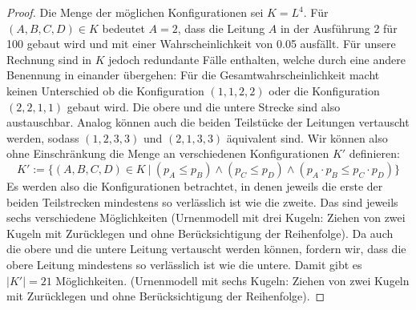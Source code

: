 \documentclass[a4paper]{scrartcl}
\begin{document}
\begin{enumerate}[label=\bfseries\arabic*.]
\begin{proof}
                    Die Menge der möglichen Konfigurationen sei $K = L^4$.
                    Für $(A, B, C, D) \in K$ bedeutet $A = 2$, dass die 
                    Leitung $A$ in der Ausführung 2 für 100 \EUR gebaut wird und
                    mit einer Wahrscheinlichkeit von \num{0,05} ausfällt.
                    Für unsere Rechnung sind in $K$ jedoch redundante Fälle
                    enthalten, welche durch eine andere Benennung in einander
                    übergehen:
                    Für die Gesamtwahrscheinlichkeit macht keinen Unterschied ob
                    die Konfiguration $(1, 1, 2, 2)$ oder die Konfiguration
                    $(2, 2, 1, 1)$ gebaut wird.
                    Die obere und die untere Strecke sind also austauschbar.
                    Analog können auch die beiden Teilstücke der Leitungen
                    vertauscht werden, sodass $(1, 2, 3, 3)$ und $(2, 1, 3, 3)$
                    äquivalent sind.
                    Wir können also ohne Einschränkung die Menge an
                    verschiedenen Konfigurationen $K'$ definieren:
                    \begin{equation*}
                        K' := \Big\{ 
                            (A, B, C, D) \in K \ |\ 
                            (p_A \leq p_B) \land (p_C \leq p_D) \land
                            (p_A \cdot p_B \leq p_C \cdot p_D)
                        \Big\}
                    \end{equation*}
                    Es werden also die Konfigurationen betrachtet, in denen
                    jeweils die erste der beiden Teilstrecken mindestens so
                    verlässlich ist wie die zweite.
                    Das sind jeweils sechs verschiedene Möglichkeiten
                    (Urnenmodell mit drei Kugeln: Ziehen von zwei Kugeln mit
                    Zurücklegen und ohne Berücksichtigung der Reihenfolge).
                    Da auch die obere und die untere Leitung vertauscht werden
                    können, fordern wir, dass die obere Leitung mindestens so
                    verlässlich ist wie die untere.
                    Damit gibt es $|K'| = 21$ Möglichkeiten.
                    (Urnenmodell mit sechs Kugeln: Ziehen von zwei Kugeln mit
                    Zurücklegen und ohne Berücksichtigung der Reihenfolge).


\end{proof}
\end{enumerate}
\end{document}
